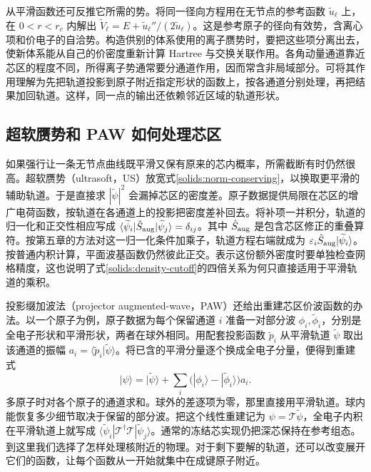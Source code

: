从平滑函数还可反推它所需的势。将同一径向方程用在无节点的参考函数 $\widetilde u_\ell$ 上，在 $0<r<r_c$ 内解出 $\widetilde V_\ell=E+\widetilde u_\ell''/(2\widetilde u_\ell)$。这是参考原子的径向有效势，含离心项和价电子的自洽势。构造供别的体系使用的离子赝势时，要把这些项分离出去，使新体系能从自己的价密度重新计算 Hartree 与交换关联作用。各角动量通道靠近芯区的程度不同，所得离子势通常要分通道作用，因而常含非局域部分。可将其作用理解为先把轨道投影到原子附近指定形状的函数上，按各通道分别处理，再把结果加回轨道。这样，同一点的输出还依赖邻近区域的轨道形状。

\subsection{超软赝势和 PAW 如何处理芯区}\label{solids:aug-core}
如果强行让一条无节点曲线既平滑又保有原来的芯内概率，所需截断有时仍然很高。超软赝势（ultrasoft，US）放宽式\eqref{solids:norm-conserving}，以换取更平滑的辅助轨道。于是直接求 $|\widetilde\psi|^2$ 会漏掉芯区的密度差。原子数据提供局限在芯区的增广电荷函数，按轨道在各通道上的投影把密度差补回去。将补项一并积分，轨道的归一化和正交性相应写成 $\langle\widetilde\psi_i|\hat S_{\rm aug}|\widetilde\psi_j\rangle=\delta_{ij}$。其中 $\hat S_{\rm aug}$ 是包含芯区修正的重叠算符。按第五章的方法对这一归一化条件加乘子，轨道方程右端就成为 $\varepsilon_i\hat S_{\rm aug}|\widetilde\psi_i\rangle$。按普通内积计算，平面波基函数仍然彼此正交。表示这份额外密度时要单独检查网格精度，这也说明了式\eqref{solids:density-cutoff}的四倍关系为何只直接适用于平滑轨道的乘积。

投影缀加波法（projector augmented-wave，PAW）还给出重建芯区价波函数的办法。以一个原子为例，原子数据为每个保留通道 $i$ 准备一对部分波 $\phi_i,\widetilde\phi_i$，分别是全电子形状和平滑形状，两者在球外相同。用配套投影函数 $\widetilde p_i$ 从平滑轨道 $\widetilde\psi$ 取出该通道的振幅 $a_i=\langle\widetilde p_i|\widetilde\psi\rangle$。将已含的平滑分量逐个换成全电子分量，便得到重建式
\begin{equation}\label{solids:paw}
 |\psi\rangle=|\widetilde\psi\rangle+
 \sum_i\bigl(|\phi_i\rangle-|\widetilde\phi_i\rangle\bigr)a_i .
\end{equation}
多原子时对各个原子的通道求和。球外的差逐项为零，那里直接用平滑轨道。球内能恢复多少细节取决于保留的部分波。把这个线性重建记为 $\psi=\mathcal T\widetilde\psi$，全电子内积在平滑轨道上就写成 $\langle\widetilde\psi_i|\mathcal T^\dagger\mathcal T|\widetilde\psi_j\rangle$。通常的冻结芯实现仍把深芯保持在参考组态。到这里我们选择了怎样处理核附近的物理。对于剩下要解的轨道，还可以改变展开它们的函数，让每个函数从一开始就集中在成键原子附近。

